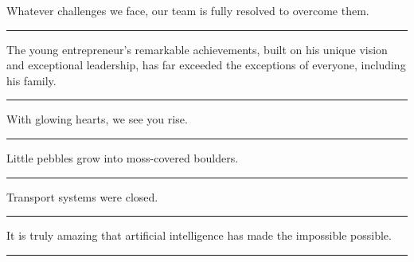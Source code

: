 \documentclass[11pt,a4paper]{article}
\newcommand{\num}[1]{\makebox[1.9em][r]{#1.}\hspace{0.3em}}
\newcommand{\wline}{\noindent\rule{\linewidth}{0.4pt}}
\begin{document}
\begin{minipage}{\linewidth}

\num{4}Whatever challenges we face, our team is fully resolved to overcome them.

\vspace{0.25em}

\wline

\end{minipage}

\begin{minipage}{\linewidth}

\num{5}The young entrepreneur’s remarkable achievements, built on his unique vision and exceptional leadership, has far exceeded the exceptions of everyone, including his family.

\vspace{0.25em}

\wline

\end{minipage}

\vspace{0.35em}\vspace{0.15em}

\begin{minipage}{\linewidth}

\num{6}With glowing hearts, we see you rise.

\vspace{0.25em}

\wline

\end{minipage}

\begin{minipage}{\linewidth}

\num{7}Little pebbles grow into moss-covered boulders.

\vspace{0.25em}

\wline

\end{minipage}

\begin{minipage}{\linewidth}

\num{8}Transport systems were closed.

\vspace{0.25em}

\wline

\end{minipage}

\begin{minipage}{\linewidth}

\num{9}It is truly amazing that artificial intelligence has made the impossible possible.

\vspace{0.25em}

\wline

\end{minipage}
\end{document}
